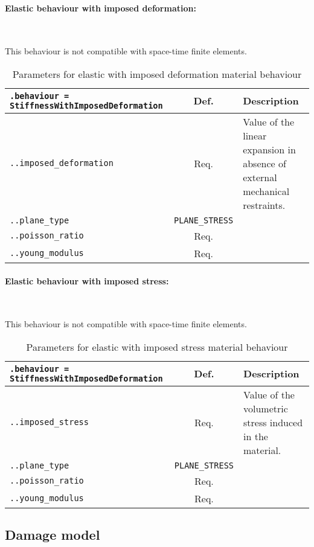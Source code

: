 \documentclass[10pt]{article}
\newcommand{\whiteline}{\textcolor{white}{.\\}}
\begin{document}
\paragraph{Elastic behaviour with imposed deformation:} \whiteline

This behaviour is not compatible with space-time finite elements.

\begin{table}[h!]
\begin{tabularx}{\textwidth}{lcX}
\verb+.behaviour = StiffnessWithImposedDeformation+ & Def. & Description\\
\hline
\verb+..imposed_deformation+ & Req. & Value of the linear expansion in absence of external mechanical restraints.\\
\verb+..plane_type+ & \verb+PLANE_STRESS+ & \\
\verb+..poisson_ratio+ & Req. & \\
\verb+..young_modulus+ & Req. & \\
\hline
\end{tabularx}
\caption{Parameters for elastic with imposed deformation material behaviour}
\end{table}

\paragraph{Elastic behaviour with imposed stress:} \whiteline

This behaviour is not compatible with space-time finite elements.

\begin{table}[h!]
\begin{tabularx}{\textwidth}{lcX}
\verb+.behaviour = StiffnessWithImposedDeformation+ & Def. & Description\\
\hline
\verb+..imposed_stress+ & Req. & Value of the volumetric stress induced in the material.\\
\verb+..plane_type+ & \verb+PLANE_STRESS+ & \\
\verb+..poisson_ratio+ & Req. & \\
\verb+..young_modulus+ & Req. & \\
\hline
\end{tabularx}
\caption{Parameters for elastic with imposed stress material behaviour}
\end{table}

\subsection{Damage model}
\end{document}
